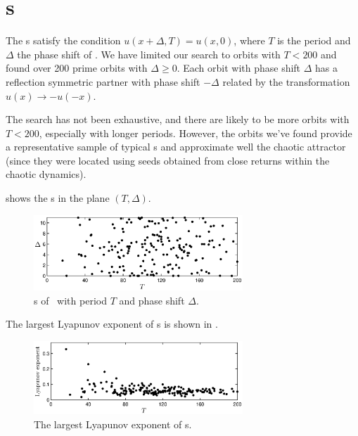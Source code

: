 %

\section{\Rpo s}

The \rpo s satisfy the condition $u(x+\Delta,T) = u(x,0)$, where $T$
is the period and $\Delta$ the phase shift of \rpo .  We have
limited our search to orbits with $T < 200$ and found over 200 prime
orbits with $\Delta \ge 0$.  Each orbit with phase shift $\Delta$
has a reflection symmetric partner with phase shift $-\Delta$
related by the transformation $u(x) \to -u(-x)$.

The search has not been exhaustive, and there are likely to be more
orbits with $T < 200$, especially with longer periods.  However, the
orbits we've found provide a representative sample of typical \rpo s
and approximate well the chaotic attractor (since they were located
using seeds obtained from close returns within the chaotic
dynamics).

 shows the \rpo s in the plane $(T,\Delta)$.
\begin{figure}[t]
\begin{center}
\includegraphics[width=0.7\textwidth]{figs/ks22_rpos_Tdelta.eps}
\end{center}
\caption{\Rpo s of \KSe\ with period $T$ and phase shift $\Delta$.
        } \label{f:ks22rposT}
\end{figure}

The largest Lyapunov exponent of \rpo s is shown in
.

\begin{figure}[t]
\begin{center}
\includegraphics[width=0.7\textwidth]{figs/ks22_rpos_lyap.eps}
\end{center}
\caption{The largest Lyapunov exponent of \rpo s.
        } \label{f:ks22rposL}
\end{figure}

